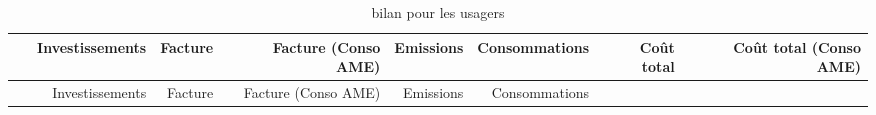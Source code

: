 
\begin{longtable}[]{@{}crrrrrrr@{}}
\caption{bilan pour les usagers}\tabularnewline
\toprule
\begin{minipage}[b]{0.12\columnwidth}\centering\strut
~\strut
\end{minipage} & \begin{minipage}[b]{0.10\columnwidth}\raggedleft\strut
Investissements\strut
\end{minipage} & \begin{minipage}[b]{0.06\columnwidth}\raggedleft\strut
Facture\strut
\end{minipage} & \begin{minipage}[b]{0.13\columnwidth}\raggedleft\strut
Facture (Conso AME)\strut
\end{minipage} & \begin{minipage}[b]{0.07\columnwidth}\raggedleft\strut
Emissions\strut
\end{minipage} & \begin{minipage}[b]{0.09\columnwidth}\raggedleft\strut
Consommations\strut
\end{minipage} & \begin{minipage}[b]{0.07\columnwidth}\raggedleft\strut
Coût total\strut
\end{minipage} & \begin{minipage}[b]{0.14\columnwidth}\raggedleft\strut
Coût total (Conso AME)\strut
\end{minipage}\tabularnewline
\midrule
\endfirsthead
\toprule
\begin{minipage}[b]{0.12\columnwidth}\centering\strut
~\strut
\end{minipage} & \begin{minipage}[b]{0.10\columnwidth}\raggedleft\strut
Investissements\strut
\end{minipage} & \begin{minipage}[b]{0.06\columnwidth}\raggedleft\strut
Facture\strut
\end{minipage} & \begin{minipage}[b]{0.13\columnwidth}\raggedleft\strut
Facture (Conso AME)\strut
\end{minipage} & \begin{minipage}[b]{0.07\columnwidth}\raggedleft\strut
Emissions\strut
\end{minipage} & \begin{minipage}[b]{0.09\columnwidth}\raggedleft\strut
Consommations\strut
\end{minipage} & \begin{minipage}[b]{0.07\columnwidth}\raggedleft\strut

\end{minipage}
\end{longtable}
